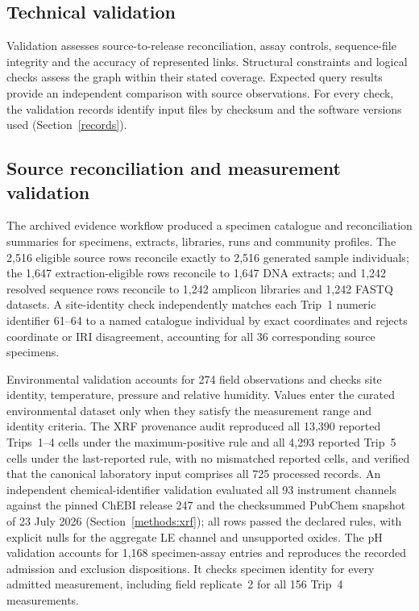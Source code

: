 \begin{revision}

\section{Technical validation}\label{valid}

Validation assesses source-to-release reconciliation, assay controls, sequence-file integrity and the accuracy of represented links. Structural constraints and logical checks assess the graph within their stated coverage. Expected query results provide an independent comparison with source observations. For every check, the validation records identify input files by checksum and the software versions used (Section~\ref{records}).

\subsection{Source reconciliation and measurement validation}

The archived evidence workflow produced a specimen catalogue and
reconciliation summaries for specimens, extracts, libraries, runs and
community profiles. The 2,516 eligible source rows reconcile exactly
to 2,516 generated sample individuals; the 1,647 extraction-eligible
rows reconcile to 1,647 DNA extracts; and 1,242 resolved sequence rows
reconcile to 1,242 amplicon libraries and 1,242 FASTQ datasets. A
site-identity check independently matches each Trip~1 numeric identifier
61--64 to a named catalogue individual by exact coordinates and
rejects coordinate or IRI disagreement, accounting for all 36 corresponding
source specimens.

Environmental validation accounts for 274 field observations and checks
site identity, temperature, pressure and relative humidity. Values enter
the curated environmental dataset only when they satisfy the measurement
range and identity criteria. The XRF provenance audit reproduced all
13,390 reported Trips~1--4 cells under the maximum-positive rule and
all 4,293 reported Trip~5 cells under the last-reported rule, with no
mismatched reported cells, and verified that the canonical laboratory
input comprises all 725 processed records. An independent
chemical-identifier validation evaluated all 93 instrument channels against
the pinned ChEBI release 247 and the checksummed PubChem snapshot of
23 July 2026 (Section~\ref{methods:xrf}); all
rows passed the declared rules, with explicit nulls for the aggregate
LE channel and unsupported oxides. The pH validation accounts for 1,168 specimen-assay entries and
reproduces the recorded admission and exclusion dispositions.
It checks specimen identity for every admitted measurement, including
field replicate~2 for all 156 Trip~4 measurements.



\end{revision}
